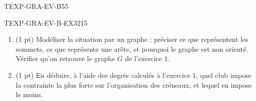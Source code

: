 \begin{evaluation}{TEXP-GRA-EV-B}{55}
\begin{exercice}{TEXP-GRA-EV-B-EX3}{2}{15}
\begin{enumerate}
  \item (1 pt) Modéliser la situation par un graphe : préciser ce que représentent les sommets, ce que représente une arête, et pourquoi le graphe est non orienté. Vérifier qu'on retrouve le graphe $G$ de l'exercice $1$.
  \item (1 pt) En déduire, à l'aide des degrés calculés à l'exercice $1$, quel club impose la contrainte la plus forte sur l'organisation des créneaux, et lequel en impose le moins.
\end{enumerate}
\end{exercice}

\end{evaluation}
